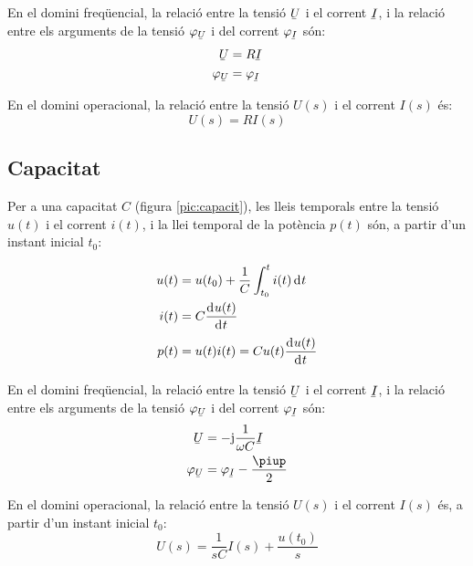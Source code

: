En el domini freqüencial, la relació entre
la tensió $\cmplx{U}$ i el corrent $\cmplx{I}$, i la relació entre els arguments de
la tensió $\varphi_{\cmplx{U}}$ i del corrent $\varphi_{\cmplx{I}}$ són:
\begin{align}
	\cmplx{U} &= R \cmplx{I} \\ \varphi_{\cmplx{U}} &= \varphi_{\cmplx{I}}
\end{align}

 En el domini operacional, la relació entre la tensió $U(s)$ i el corrent $I(s)$ és:
\begin{equation}
	U(s) = R I(s)
\end{equation}

\subsection{Capacitat} 

Per a una capacitat $C$ (figura
\vref{pic:capacit}), les lleis temporals entre la tensió $u(t)$ i el
corrent $i(t)$, i la llei temporal de la potència $p(t)$ són, a partir d'un instant inicial $t_0$:

\hfill
\begin{minipage}[b]{5cm}
	
	\label{pic:capacit}
\end{minipage}
\hfill
\begin{minipage}[b][3.8cm][t]{8cm}
	\begin{align}
		u(t) &= u(t_0) + \frac{1}{C} \int_{t_0}^t i(t) \diff t \\
		i(t) &= C \deriv{u(t)}{t} \\
		p(t) &= u(t) i(t) = C u(t) \deriv{u(t)}{t}
	\end{align}
\end{minipage}

En el domini freqüencial, la relació entre la tensió $\cmplx{U}$ i el corrent $\cmplx{I}$, i la relació entre els arguments de la tensió $\varphi_{\cmplx{U}}$ i del corrent $\varphi_{\cmplx{I}}$ són:
\begin{align}
	\cmplx{U} &= -\ju \frac{1}{\omega C} \cmplx{I} \\
	\varphi_{\cmplx{U}} &= \varphi_{\cmplx{I}} - \frac{\piup}{2}
\end{align}

En el domini operacional, la relació entre la tensió $U(s)$ i el corrent $I(s)$ és, a partir d'un instant inicial $t_0$:
\begin{equation}
	U(s) = \frac{1}{s C} I(s) + \frac{u(t_0)}{s}
\end{equation}


